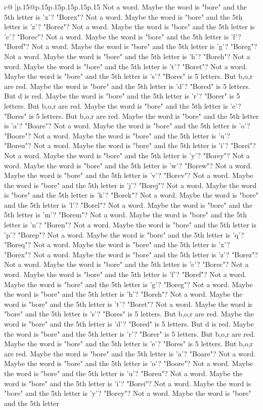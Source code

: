 \documentclass{article}
\begin{document}
{\begin{supertabular}{c@{$\;$}|p{.15\linewidth}@{}p{.15\linewidth}p{.15\linewidth}p{.15\linewidth}p{.15\linewidth}p{.15\linewidth}}
{{{Not a word. Maybe the word is "bore" and the 5th letter is 'x'? "Borex"? Not a word. Maybe the word is "bore" and the 5th letter is 'z'? "Borez"? Not a word. Maybe the word is "bore" and the 5th letter is 'c'? "Borec"? Not a word. Maybe the word is "bore" and the 5th letter is 'f'? "Boref"? Not a word. Maybe the word is "bore" and the 5th letter is 'g'? "Boreg"? Not a word. Maybe the word is "bore" and the 5th letter is 'h'? "Boreh"? Not a word. Maybe the word is "bore" and the 5th letter is 't'? "Boret"? Not a word. Maybe the word is "bore" and the 5th letter is 's'? "Bores" is 5 letters. But b,o,r are red. Maybe the word is "bore" and the 5th letter is 'd'? "Bored" is 5 letters. But d is red. Maybe the word is "bore" and the 5th letter is 'r'? "Borer" is 5 letters. But b,o,r are red. Maybe the word is "bore" and the 5th letter is 'e'? "Bores" is 5 letters. But b,o,r are red. Maybe the word is "bore" and the 5th letter is 'a'? "Boare"? Not a word. Maybe the word is "bore" and the 5th letter is 'o'? "Boore"? Not a word. Maybe the word is "bore" and the 5th letter is 'u'? "Boreu"? Not a word. Maybe the word is "bore" and the 5th letter is 'i'? "Borei"? Not a word. Maybe the word is "bore" and the 5th letter is 'y'? "Borey"? Not a word. Maybe the word is "bore" and the 5th letter is 'w'? "Borew"? Not a word. Maybe the word is "bore" and the 5th letter is 'v'? "Borev"? Not a word. Maybe the word is "bore" and the 5th letter is 'j'? "Borej"? Not a word. Maybe the word is "bore" and the 5th letter is 'k'? "Borek"? Not a word. Maybe the word is "bore" and the 5th letter is 'l'? "Borel"? Not a word. Maybe the word is "bore" and the 5th letter is 'm'? "Borem"? Not a word. Maybe the word is "bore" and the 5th letter is 'n'? "Boren"? Not a word. Maybe the word is "bore" and the 5th letter is 'p'? "Borep"? Not a word. Maybe the word is "bore" and the 5th letter is 'q'? "Boreq"? Not a word. Maybe the word is "bore" and the 5th letter is 'x'? "Borex"? Not a word. Maybe the word is "bore" and the 5th letter is 'z'? "Borez"? Not a word. Maybe the word is "bore" and the 5th letter is 'c'? "Borec"? Not a word. Maybe the word is "bore" and the 5th letter is 'f'? "Boref"? Not a word. Maybe the word is "bore" and the 5th letter is 'g'? "Boreg"? Not a word. Maybe the word is "bore" and the 5th letter is 'h'? "Boreh"? Not a word. Maybe the word is "bore" and the 5th letter is 't'? "Boret"? Not a word. Maybe the word is "bore" and the 5th letter is 's'? "Bores" is 5 letters. But b,o,r are red. Maybe the word is "bore" and the 5th letter is 'd'? "Bored" is 5 letters. But d is red. Maybe the word is "bore" and the 5th letter is 'r'? "Borer" is 5 letters. But b,o,r are red. Maybe the word is "bore" and the 5th letter is 'e'? "Bores" is 5 letters. But b,o,r are red. Maybe the word is "bore" and the 5th letter is 'a'? "Boare"? Not a word. Maybe the word is "bore" and the 5th letter is 'o'? "Boore"? Not a word. Maybe the word is "bore" and the 5th letter is 'u'? "Boreu"? Not a word. Maybe the word is "bore" and the 5th letter is 'i'? "Borei"? Not a word. Maybe the word is "bore" and the 5th letter is 'y'? "Borey"? Not a word. Maybe the word is "bore" and the 5th letter }}}
\end{supertabular}}
\end{document}
